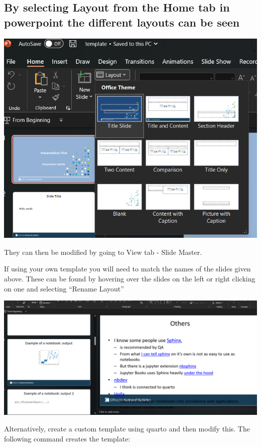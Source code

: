 \documentclass[
  letterpaper,
  DIV=11,
  numbers=noendperiod]{scrartcl}
\begin{document}
\hypertarget{by-selecting-layout-from-the-home-tab-in-powerpoint-the-different-layouts-can-be-seen}{%
\subsection{By selecting Layout from the Home tab in powerpoint the
different layouts can be
seen}\label{by-selecting-layout-from-the-home-tab-in-powerpoint-the-different-layouts-can-be-seen}}

\includegraphics{ghtop_images/ppt_layout.png}

They can then be modified by going to View tab - Slide Master.

If using your own template you will need to match the names of the
slides given above. These can be found by hovering over the slides on
the left or right clicking on one and selecting ``Rename Layout''

\includegraphics{ghtop_images/ppt_master.png}

Alternatively, create a custom template using quarto and then modify
this. The following command creates the template:
\end{document}
